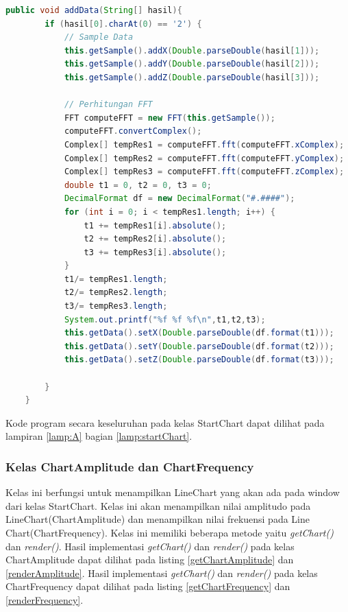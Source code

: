 \begin{lstlisting}[language=Java, caption=Metode addData(), label=addData]
    public void addData(String[] hasil){
        if (hasil[0].charAt(0) == '2') {
            // Sample Data
            this.getSample().addX(Double.parseDouble(hasil[1]));
            this.getSample().addY(Double.parseDouble(hasil[2]));
            this.getSample().addZ(Double.parseDouble(hasil[3]));

            // Perhitungan FFT
            FFT computeFFT = new FFT(this.getSample());
            computeFFT.convertComplex();
            Complex[] tempRes1 = computeFFT.fft(computeFFT.xComplex);
            Complex[] tempRes2 = computeFFT.fft(computeFFT.yComplex);
            Complex[] tempRes3 = computeFFT.fft(computeFFT.zComplex);
            double t1 = 0, t2 = 0, t3 = 0;
            DecimalFormat df = new DecimalFormat("#.####");
            for (int i = 0; i < tempRes1.length; i++) {
                t1 += tempRes1[i].absolute();
                t2 += tempRes2[i].absolute();	
                t3 += tempRes3[i].absolute();
            }
            t1/= tempRes1.length;
            t2/= tempRes2.length;
            t3/= tempRes3.length;
            System.out.printf("%f %f %f\n",t1,t2,t3);
            this.getData().setX(Double.parseDouble(df.format(t1)));
            this.getData().setY(Double.parseDouble(df.format(t2)));
            this.getData().setZ(Double.parseDouble(df.format(t3)));
            
        }
    }
\end{lstlisting}
Kode program secara keseluruhan pada kelas StartChart dapat dilihat pada lampiran \ref{lamp:A} bagian \ref{lamp:startChart}.

\subsubsection{Kelas ChartAmplitude dan ChartFrequency}
Kelas ini berfungsi untuk menampilkan LineChart yang akan ada pada window dari kelas StartChart. Kelas ini akan menampilkan nilai amplitudo pada LineChart(ChartAmplitude) dan menampilkan nilai frekuensi pada Line Chart(ChartFrequency). Kelas ini memiliki beberapa metode yaitu \textit{getChart()} dan \textit{render()}. Hasil implementasi \textit{getChart()} dan \textit{render()} pada kelas ChartAmplitude dapat dilihat pada listing \ref{getChartAmplitude} dan \ref{renderAmplitude}. Hasil implementasi \textit{getChart()} dan \textit{render()} pada kelas ChartFrequency dapat dilihat pada listing \ref{getChartFrequency} dan \ref{renderFrequency}.

